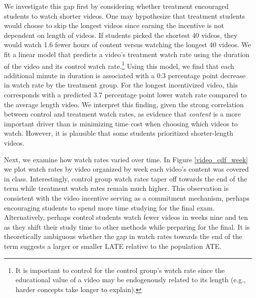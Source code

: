 \documentclass[12pt]{article}
\begin{document}
We investigate this gap first by considering whether treatment encouraged students to watch shorter videos. One may hypothesize that treatment students would choose to skip the longest videos since earning the incentive is not dependent on length of videos. If students picked the shortest 40 videos, they would watch 1.6 fewer hours of content versus watching the longest 40 videos. We fit a linear model that predicts a video's treatment watch rate using the duration of the video and its control watch rate.\footnote{It is important to control for the control group's watch rate since the educational value of a video may be endogenously related to its length (e.g., harder concepts take longer to explain).} Using this model, we find that each additional minute in duration is associated with a 0.3 percentage point decrease in watch rate by the treatment group. For the longest incentivized video, this corresponds with a predicted 3.7 percentage point lower watch rate compared to the average length video. We interpret this finding, given the strong correlation between control and treatment watch rates, as evidence that \textit{content} is a more important driver than is minimizing time cost when choosing which videos to watch. However, it is plausible that some students prioritized shorter-length videos.

Next, we examine how watch rates varied over time. In Figure \ref{video_cdf_week} we plot watch rates by video organized by week each video's content was covered in class. Interestingly, control group watch rates taper off towards the end of the term while treatment watch rates remain much higher. This observation is consistent with the video incentive serving as a commitment mechanism, perhaps encouraging students to spend more time studying for the final exam. Alternatively, perhaps control students watch fewer videos in weeks nine and ten as they shift their study time to other methods while preparing for the final. It is theoretically ambiguous whether the gap in watch rates towards the end of the term suggests a larger or smaller LATE relative to the population ATE.
\end{document}
